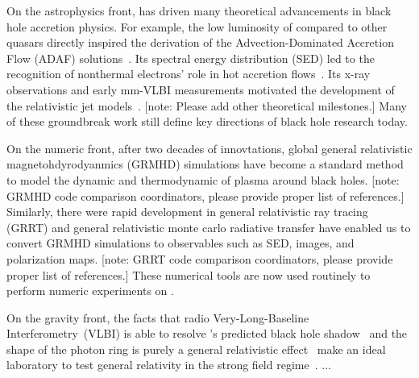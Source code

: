 \documentclass[twocolumn,tighten,dvipsnames,linenumbers]{aastex63}
\newcommand\note[1]{{\color{OliveGreen}[note: #1]}}
\begin{document}
On the astrophysics front, \sgra has driven many theoretical
advancements in black hole accretion physics.
For example, the low luminosity of \sgra compared to other quasars
directly inspired the derivation of the Advection-Dominated Accretion
Flow (ADAF) solutions~\citep{1994ApJ...428L..13N, 1995ApJ...444..231N,
  1995ApJ...452..710N, 1996A&AS..120C.287N, 1998ApJ...492..554N}.
Its spectral energy distribution (SED) led to the recognition of
nonthermal electrons' role in hot accretion
flows~\citep{2000ApJ...541..234O}.
Its x-ray observations and early mm-VLBI measurements motivated the
development of the relativistic jet models~\citep{2000A&A...362..113F,
  2004A&A...414..895F, 2005ApJ...635.1203M}.
\note{Please add other theoretical milestones.}
Many of these groundbreak work still define key directions of black
hole research today.

On the numeric front, after two decades of innovtations, global
general relativistic magnetohdyrodyanmics (GRMHD) simulations
\citep[e.g.,][]{2000ApJ...528..462H, 2003ApJ...589..458D,
  2003ApJ...589..444G, 2007CQGra..24S.235G, 2012ApJS..201....9F,
  2014ApJ...796...22F, 2016ApJS..225...22W, 2017ApJS..231...17A,
  2018JPhCS1031a2008O, 2019A&A...629A..61O, 2019ApJS..243...26P} have
become a standard method to model the dynamic and thermodynamic of
plasma around black holes.
\note{GRMHD code comparison coordinators, please provide proper list
  of references.}
Similarly, there were rapid development in general relativistic ray
tracing (GRRT) \citep[e.g.,][]{1992MNRAS.259..569K,2004MNRAS.349..994B,2007CQGra..24S.259N,2009ApJ...696.1616D,
  2012ApJ...745....1P, 2013ApJ...777...13C,
  2016MNRAS.462..115D, 2016ApJ...820..105P,
  2018MNRAS.475...43M, 2018ApJ...867...59C,
  2018A&A...613A...2B, 2020ApJ...897..148G, 2020arXiv200703045B} and
general relativistic monte carlo radiative transfer
\citep{2009ApJS..184..387D,2013ApJ...777...11S, 2020MNRAS.491.4807M} have enabled us to
convert GRMHD simulations to observables such as SED, images, and
polarization maps.
\note{GRRT code comparison coordinators, please provide proper list of
  references.}
These numerical tools are now used routinely to perform numeric
experiments on \sgra.

On the gravity front, the facts that radio Very-Long-Baseline
Interferometry~(VLBI) is able to resolve \sgra's predicted black hole
shadow~\citep{2000ApJ...528L..13F} and the shape of the photon ring is
purely a general relativistic effect~\citep{2010ApJ...718..446J} make
\sgra an ideal laboratory to test general relativity in the strong
field regime~\citep{2010ApJ...718..446J, 2014ApJ...784....7B,
  2015ApJ...802...63B, 2015ApJ...814..115P, 2016ApJ...818..121P,
  2016PhRvL.117i1101J, 2019GReGr..51..137P}.
...
\end{document}
